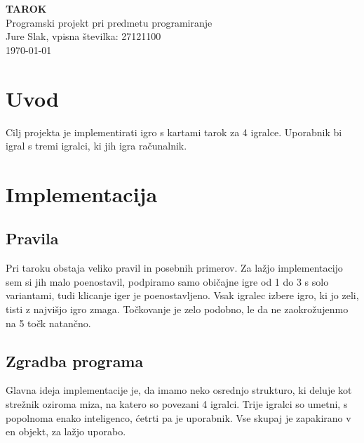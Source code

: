 \documentclass{article}
\begin{document}
\thispagestyle{empty}

\begin{center}
{\bf \Huge TAROK} \\[24pt]
{\Large Programski projekt pri predmetu programiranje} \\[12pt]
{\Large Jure Slak, vpisna številka: 27121100} \\[12pt]
\today
\end{center}

\tableofcontents
\newpage

\section{Uvod}
Cilj projekta je implementirati igro s kartami tarok za 4 igralce. Uporabnik bi igral s tremi igralci, ki jih igra računalnik.

\section{Implementacija}
\subsection{Pravila}
Pri taroku obstaja veliko pravil in posebnih primerov. Za lažjo implementacijo sem si jih malo poenostavil, podpiramo samo običajne igre od 1 do 3 s solo variantami, tudi klicanje iger je poenostavljeno. Vsak igralec izbere igro, ki jo zeli, tisti z najvišjo igro zmaga. Točkovanje je zelo podobno, le da ne zaokrožujenmo na 5 točk natančno.

\subsection{Zgradba programa}
Glavna ideja implementacije je, da imamo neko osrednjo strukturo, ki deluje kot strežnik oziroma miza, na katero so povezani 4 igralci. Trije igralci so umetni, s popolnoma enako inteligenco, ćetrti pa je uporabnik. Vse skupaj je zapakirano v en objekt, za lažjo uporabo.
\end{document}
